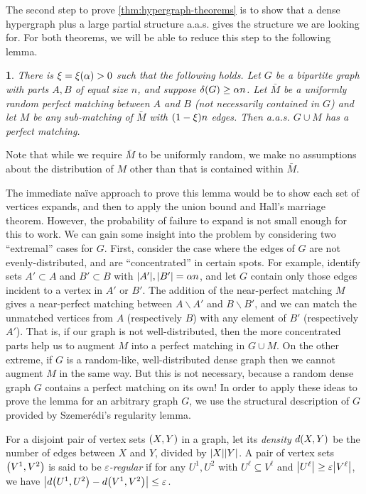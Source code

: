\documentclass[11pt,english]{article}
\theoremstyle{plain}
\theoremstyle{definition}
\theoremstyle{definition}
\theoremstyle{plain}
\theoremstyle{plain}
\theoremstyle{plain}
\newtheorem{lem}[thm]{\protect\lemmaname}
\theoremstyle{plain}
\theoremstyle{remark}
\theoremstyle{remark}
\let\originalleft\left
\let\originalright\right
\renewcommand{\left}{\mathopen{}\mathclose\bgroup\originalleft}
\renewcommand{\right}{\aftergroup\egroup\originalright}
\providecommand{\lemmaname}{Lemma}
\begin{document}
The second step to prove \ref{thm:hypergraph-theorems} is to show that a dense
hypergraph plus a large partial structure a.a.s.{} gives the structure
we are looking for. For both theorems, we will be able to reduce this
step to the following lemma.
\begin{lem}
\label{lem:bipartite-plus-big-matching-perfect}There is $\xi=\xi\left(\alpha\right)>0$ 
such that the following holds. Let $G$ be a bipartite graph with
parts $A,B$ of equal size $n$, and suppose $\delta\left(G\right)\ge\alpha n$.
Let $\bar{M}$ be a uniformly random perfect matching between $A$
and $B$ (not necessarily contained in $G$) and let $M$ be any sub-matching of $\bar{M}$ with $\left(1-\xi\right) n$
edges. Then a.a.s.{} $G\cup M$ has a perfect matching. 
\end{lem}

Note that while we require $\bar M$ to be uniformly random, we make no assumptions about the distribution of $M$ other than that is contained within $\bar M$.

The immediate na\"ive approach to prove this lemma would be to show each set of vertices expands, and then to apply the union bound and Hall's marriage theorem. However, the
probability of failure to expand is not small enough for this to work.
We can gain some insight into the problem by considering two ``extremal''
cases for $G$. First, consider the case where the edges of $G$ are
not evenly-distributed, and are ``concentrated'' in certain spots.
For example, identify sets $A'\subset A$ and $B'\subset B$ with
$\left|A'\right|,\left|B'\right|=\alpha n$, and let $G$ contain
only those edges incident to a vertex in $A'$ or $B'$. The addition
of the near-perfect matching $M$ gives a near-perfect matching between
$A\backslash A'$ and $B\backslash B'$, and we can match the unmatched
vertices from $A$ (respectively $B$) with any element of $B'$ (respectively
$A'$). That is, if our graph is not well-distributed, then the more
concentrated parts help us to augment $M$ into a perfect matching in
$G\cup M$. On the other extreme, if $G$ is a random-like, well-distributed
dense graph then we cannot augment $M$ in the same way. But this
is not necessary, because a random dense graph $G$ contains a perfect
matching on its own! In order to apply these ideas to prove the lemma
for an arbitrary graph $G$, we use the structural description of
$G$ provided by Szemer\'edi's regularity lemma.

For a disjoint pair of vertex sets $\left(X,Y\right)$ in a graph,
let its \emph{density} $d\left(X,Y\right)$ be the number of edges
between $X$ and $Y$, divided by $\left|X\right|\left|Y\right|$.
A pair of vertex sets $\left(V^{1},V^{2}\right)$ is said to be \emph{$\varepsilon$-regular}
if for any $U^{1},U^{2}$ with $U^{\ell}\subseteq V^{\ell}$ and $\left|U^{\ell}\right|\ge\varepsilon\left|V^{\ell}\right|$,
we have $\left|d\left(U^{1},U^{2}\right)-d\left(V^{1},V^{2}\right)\right|\le\varepsilon$.
\end{document}
